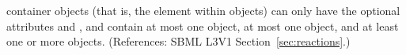 \ListOfModifierSpeciesReferences container objects (that is, the element
 within \Reaction objects) can only have the
optional attributes  and , and contain at most
one \Notes object, at most one \Annotation object, and at least one or more
\ModifierSpeciesReference objects.  (References: SBML L3V1
Section~\ref{sec:reactions}.)
